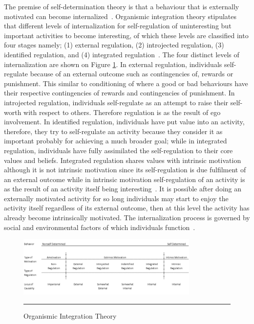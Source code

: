 The premise of self-determination theory is that a behaviour that is externally motivated can become internalized~\citep{ryan2000intrinsic}.
Organismic integration theory stipulates that different levels of internalization for self-regulation of uninteresting but important activities to become interesting, of which these levels are classified into four stages namely; (1) external regulation, (2) introjected regulation, (3) identified regulation, and (4) integrated regulation~\citep{ryan2000intrinsic}. The four distinct levels of internalization are shown on Figure \ref{figure:oit}. In external regulation, individuals self-regulate because of an external outcome such as contingencies of, rewards or punishment. This similar to conditioning of where a good or bad behaviours have their respective contingencies of rewards and contingencies of punishment. In introjected regulation, individuals self-regulate as an attempt to raise their self-worth with respect to others. Therefore regulation is as the result of ego involvement. In identified regulation, individuals have put value into an activity, therefore, they try to self-regulate an activity because they consider it as important probably for achieving a much broader goal; while in integrated regulation, individuals have fully assimilated the self-regulation to their core values and beliefs.  Integrated regulation shares values with intrinsic motivation although it is not intrinsic motivation since its self-regulation is due fulfilment of an external outcome while in intrinsic motivation self-regulation of an activity is as the result of an activity itself being interesting~\citep{ryan2000intrinsic}. It is possible after doing an externally motivated activity for so long individuals may start to enjoy the activity itself regardless of its external outcome, then at this level the activity has already become intrinsically motivated. The internalization process is governed by social and environmental factors of which individuals function~\citep{ryan2000:self,lee2015:relating}.
\begin{figure}[htbp]
  \centering
    \includegraphics[width=0.8\textwidth]{Figures/oit.png}
    \rule{35em}{0.5pt}
  \caption{Organismic Integration Theory~\citep{ryan2000intrinsic}}
  \label{figure:oit}
\end{figure}

